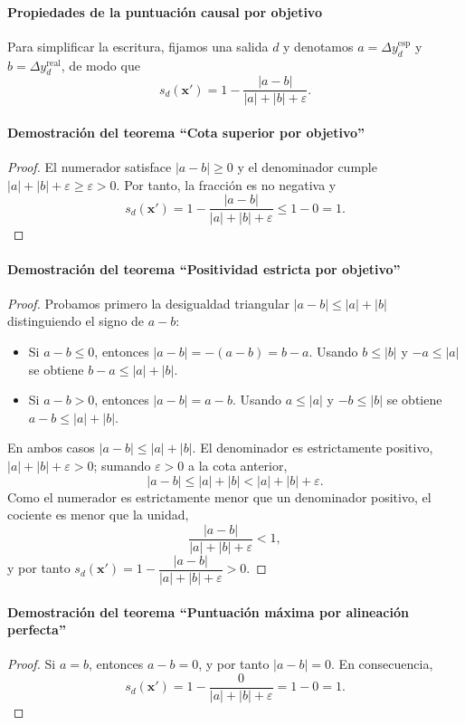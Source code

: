 \documentclass[12pt]{report} %
\begin{document}
\paragraph*{Propiedades de la puntuación causal por objetivo}

Para simplificar la escritura, fijamos una salida $d$ y denotamos $a = \Delta y_d^{\text{esp}}$ y $b = \Delta y_d^{\text{real}}$, de modo que
$$s_d(\mathbf{x}') = 1 - \frac{|a - b|}{|a| + |b| + \varepsilon}.$$

\paragraph*{Demostración del teorema ``Cota superior por objetivo''}
\begin{proof}
    El numerador satisface $|a - b| \geq 0$ y el denominador cumple $|a| + |b| + \varepsilon \geq \varepsilon > 0$. Por tanto, la fracción es no negativa y
    $$s_d(\mathbf{x}') = 1 - \frac{|a - b|}{|a| + |b| + \varepsilon} \leq 1 - 0 = 1.$$
\end{proof}

\paragraph*{Demostración del teorema ``Positividad estricta por objetivo''}
\begin{proof}
    Probamos primero la desigualdad triangular $|a - b| \leq |a| + |b|$ distinguiendo el signo de $a - b$:
    \begin{itemize}
        \item Si $a - b \leq 0$, entonces $|a - b| = -(a - b) = b - a$. Usando $b \leq |b|$ y $-a \leq |a|$ se obtiene $b - a \leq |a| + |b|$.
        \item Si $a - b > 0$, entonces $|a - b| = a - b$. Usando $a \leq |a|$ y $-b \leq |b|$ se obtiene $a - b \leq |a| + |b|$.
    \end{itemize}
    En ambos casos $|a - b| \leq |a| + |b|$. El denominador es estrictamente positivo, $|a| + |b| + \varepsilon > 0$; sumando $\varepsilon > 0$ a la cota anterior,
    $$|a - b| \leq |a| + |b| < |a| + |b| + \varepsilon.$$
    Como el numerador es estrictamente menor que un denominador positivo, el cociente es menor que la unidad,
    $$\frac{|a - b|}{|a| + |b| + \varepsilon} < 1,$$
    y por tanto $s_d(\mathbf{x}') = 1 - \dfrac{|a - b|}{|a| + |b| + \varepsilon} > 0$.
\end{proof}

\paragraph*{Demostración del teorema ``Puntuación máxima por alineación perfecta''}
\begin{proof}
    Si $a = b$, entonces $a - b = 0$, y por tanto $|a - b| = 0$. En consecuencia,
    $$s_d(\mathbf{x}') = 1 - \frac{0}{|a| + |b| + \varepsilon} = 1 - 0 = 1.$$
\end{proof}
\end{document}
